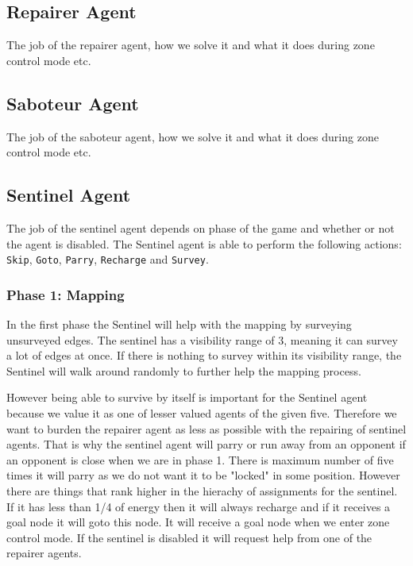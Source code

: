 \documentclass[11pt]{article}
\begin{document}
\subsection{Repairer Agent}
The job of the repairer agent, how we solve it and what it does during zone control mode etc.

\subsection{Saboteur Agent}
The job of the saboteur agent, how we solve it and what it does during zone control mode etc.

\subsection{Sentinel Agent}
The job of the sentinel agent depends on phase of the game and whether or not the agent is disabled. The Sentinel agent is able to perform the following actions: {\tt Skip}, {\tt Goto}, {\tt Parry}, {\tt Recharge} and {\tt Survey}.

\subsubsection{Phase 1: Mapping}
In the first phase the Sentinel will help with the mapping by surveying unsurveyed edges. The sentinel has a visibility range of 3, meaning it can survey a lot of edges at once. If there is nothing to survey within its visibility range, the Sentinel will walk around randomly to further help the mapping process.

However being able to survive by itself is important for the Sentinel agent because we value it as one of lesser valued agents of the given five. Therefore we want to burden the repairer agent as less as possible with the repairing of sentinel agents. That is why the sentinel agent will parry or run away from an opponent if an opponent is close when we are in phase 1. There is maximum number of five times it will parry as we do not want it to be "locked" in some position. However there are things that rank higher in the hierachy of assignments for the sentinel. If it has less than 1/4 of energy then it will always recharge and if it receives a goal node it will goto this node. It will receive a goal node when we enter zone control mode. If the sentinel is disabled it will request help from one of the repairer agents.
 
\end{document}
